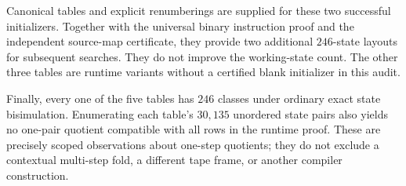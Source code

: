 Canonical tables and explicit renumberings are supplied for these two
successful initializers.  Together with the universal binary
instruction proof and the independent source-map certificate, they
provide two additional $246$-state layouts for subsequent searches.
They do not improve the working-state count.  The other three tables
are runtime variants without a certified blank initializer in this
audit.

Finally, every one of the five tables has $246$ classes under ordinary
exact state bisimulation.  Enumerating each table's $30,135$ unordered
state pairs also yields no one-pair quotient compatible with all rows
in the runtime proof.  These are precisely scoped observations about
one-step quotients; they do not exclude a contextual multi-step fold,
a different tape frame, or another compiler construction.
